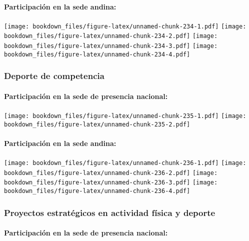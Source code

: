 \documentclass[]{article}
\let\oldparagraph\paragraph
\renewcommand{\paragraph}[1]{\oldparagraph{#1}\mbox{}}
\theoremstyle{definition}
\theoremstyle{definition}
\theoremstyle{definition}
\theoremstyle{remark}
\begin{document}
\paragraph{Participación en la sede
andina:}\label{participacion-en-la-sede-andina-29}

\texttt{[image: bookdown\_files/figure-latex/unnamed-chunk-234-1.pdf]}
\texttt{[image: bookdown\_files/figure-latex/unnamed-chunk-234-2.pdf]}
\texttt{[image: bookdown\_files/figure-latex/unnamed-chunk-234-3.pdf]}
\texttt{[image: bookdown\_files/figure-latex/unnamed-chunk-234-4.pdf]}

\subsubsection{Deporte de competencia}\label{deporte-de-competencia-1}

\paragraph{Participación en la sede de presencia
nacional:}\label{participacion-en-la-sede-de-presencia-nacional-30}

\texttt{[image: bookdown\_files/figure-latex/unnamed-chunk-235-1.pdf]}
\texttt{[image: bookdown\_files/figure-latex/unnamed-chunk-235-2.pdf]}

\paragraph{Participación en la sede
andina:}\label{participacion-en-la-sede-andina-30}

\texttt{[image: bookdown\_files/figure-latex/unnamed-chunk-236-1.pdf]}
\texttt{[image: bookdown\_files/figure-latex/unnamed-chunk-236-2.pdf]}
\texttt{[image: bookdown\_files/figure-latex/unnamed-chunk-236-3.pdf]}
\texttt{[image: bookdown\_files/figure-latex/unnamed-chunk-236-4.pdf]}

\subsubsection{Proyectos estratégicos en actividad física y
deporte}\label{proyectos-estrategicos-en-actividad-fisica-y-deporte-1}

\paragraph{Participación en la sede de presencia
nacional:}\label{participacion-en-la-sede-de-presencia-nacional-31}
\end{document}
